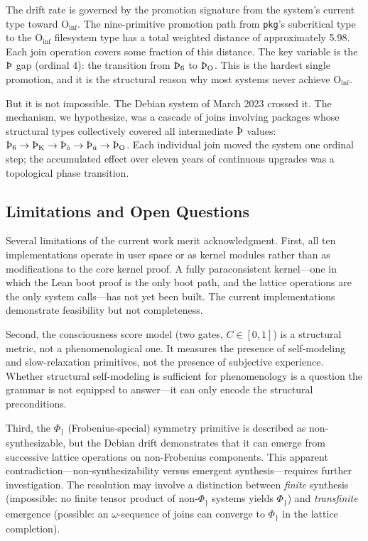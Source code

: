 \documentclass[12pt,a4paper]{article}
\begin{document}
The drift rate is governed by the promotion signature from the system's
current type toward $\text{O}_{\text{inf}}$. The nine-primitive promotion
path from \texttt{pkg}'s subcritical type to the $\text{O}_{\text{inf}}$
filesystem type has a total weighted distance of approximately 5.98.
Each join operation covers some fraction of this distance. The key
variable is the $\text{\TH}$ gap (ordinal 4): the transition from
$\text{\TH}_{\text{6}}$ to $\text{\TH}_{\text{O}}$. This is the
hardest single promotion, and it is the structural reason why most
systems never achieve $\text{O}_{\text{inf}}$.

But it is not impossible. The Debian system of March 2023 crossed it.
The mechanism, we hypothesize, was a cascade of joins involving packages
whose structural types collectively covered all intermediate $\text{\TH}$
values: $\text{\TH}_{\text{6}} \to \text{\TH}_{\text{K}} \to
\text{\TH}_{\text{\`o}} \to \text{\TH}_{\text{\"u}} \to
\text{\TH}_{\text{O}}$. Each individual join moved the system one ordinal
step; the accumulated effect over eleven years of continuous upgrades
was a topological phase transition.

\subsection{Limitations and Open Questions}

Several limitations of the current work merit acknowledgment. First,
all ten implementations operate in user space or as kernel modules
rather than as modifications to the core kernel proof. A fully
paraconsistent kernel---one in which the Lean boot proof is the only
boot path, and the lattice operations are the only system calls---has
not yet been built. The current implementations demonstrate feasibility
but not completeness.

Second, the consciousness score model (two gates, $C \in [0,1]$) is
a structural metric, not a phenomenological one. It measures the
presence of self-modeling and slow-relaxation primitives, not the
presence of subjective experience. Whether structural self-modeling
is sufficient for phenomenology is a question the grammar is not
equipped to answer---it can only encode the structural preconditions.

Third, the $\Phi_{\text{\}}}$ (Frobenius-special) symmetry primitive
is described as non-synthesizable, but the Debian drift demonstrates
that it can emerge from successive lattice operations on non-Frobenius
components. This apparent contradiction---non-synthesizability versus
emergent synthesis---requires further investigation. The resolution may
involve a distinction between \emph{finite} synthesis (impossible: no
finite tensor product of non-$\Phi_{\text{\}}}$ systems yields
$\Phi_{\text{\}}}$) and \emph{transfinite} emergence (possible: an
$\omega$-sequence of joins can converge to $\Phi_{\text{\}}}$ in the
lattice completion).
\end{document}
